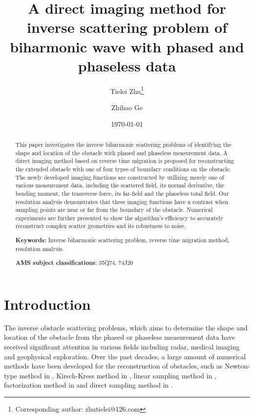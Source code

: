 \documentclass[10pt,a4paper]{article}
\numberwithin{equation}{section}
\begin{document}
	\begin{titlepage}
          \title{\bfseries A direct imaging method for inverse scattering problem of biharmonic wave with phased and phaseless data}
		\author{Tielei Zhu\thanks{Corresponding author: zhutielei@126.com}}
		\author{Zhihao Ge}
		
		\date{\today}
	\end{titlepage}
	\maketitle
	\vspace{.2in}

\begin{abstract}
This paper investigates the inverse biharmonic scattering problems of identifying the shape and location of the obstacle with phased and phaseless measurement data. A direct imaging method based on reverse time migration is proposed for reconstructing the extended obstacle with one of four types of boundary conditions on the obstacle. The newly developed imaging functions are constructed by utilizing merely one of various measurement data, including  the scattered field, its normal derivative, the bending moment, the  transverse force, its far-field and the phaseless total field. Our resolution analysis demonstrates that these imaging functions have a contrast  when sampling points are near or far from the boundary of the obstacle. Numerical experiments  are further  presented to show  the algorithm's efficiency to accurately reconstruct complex scatter geometries and its robustness to noise.

\vspace{.2in} {\bf Keywords:} Inverse biharmonic scattering problem, reverse time migration method, resolution analysis.

\vspace{.2in} {\bf AMS subject classifications}: 35Q74, 74J20
\end{abstract}

\section{Introduction}\label{sec:intro}
The inverse obstacle scattering problems, which aims to determine the shape and location of the obstacle from the phased or phaseless measurement data have received significant attention in various fields including radar, medical imaging and geophysical exploration. Over the past decades, a large amount of numerical methods have been developed for the reconstruction of obstacles, such as Newton-type method in \cite{Hohage_newton_1998}, Kirsch-Kress method in \cite{colton_inverse_2019}, linear sampling method in \cite{colton_linear_2011}, factorization method in \cite{kirsch_factorization_2008} and direct sampling method in \cite{ito_direct_2012,potthast_study_2010}.
\end{document}
